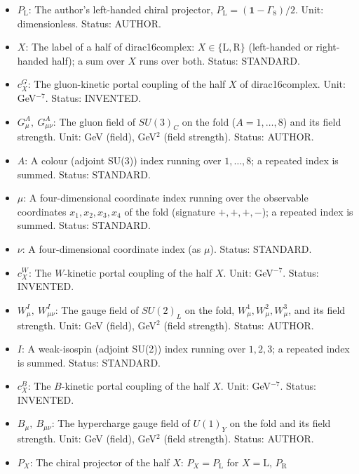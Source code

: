 \documentclass[
  10pt,
]{article}
\begin{document}
\begin{itemize}
  states, its adjoint with respect to the scalar product of that space
  (for the quantised dirac16complex the indefinite Krein scalar
  product). Status: STANDARD.
\item
  \(P_{\mathrm{L}}\): The author's left-handed chiral projector,
  \(P_{\mathrm{L}} = (\mathbf{1} - \Gamma_8)/2\). Unit: dimensionless.
  Status: AUTHOR.
\item
  \(X\): The label of a half of dirac16complex:
  \(X \in \{\mathrm{L}, \mathrm{R}\}\) (left-handed or right-handed
  half); a sum over \(X\) runs over both. Status: STANDARD.
\item
  \(c^{G}_X\): The gluon-kinetic portal coupling of the half \(X\) of
  dirac16complex. Unit: GeV\(^{-7}\). Status: INVENTED.
\item
  \(G^A_\mu,\ G^A_{\mu\nu}\): The gluon field of \(SU(3)_C\) on the fold
  (\(A = 1, \dots, 8\)) and its field strength. Unit: GeV (field),
  GeV\(^2\) (field strength). Status: AUTHOR.
\item
  \(A\): A colour (adjoint SU(3)) index running over \(1, \dots, 8\); a
  repeated index is summed. Status: STANDARD.
\item
  \(\mu\): A four-dimensional coordinate index running over the
  observable coordinates \(x_1, x_2, x_3, x_4\) of the fold (signature
  \(+,+,+,-\)); a repeated index is summed. Status: STANDARD.
\item
  \(\nu\): A four-dimensional coordinate index (as \(\mu\)). Status:
  STANDARD.
\item
  \(c^{W}_X\): The \(W\)-kinetic portal coupling of the half \(X\).
  Unit: GeV\(^{-7}\). Status: INVENTED.
\item
  \(W^I_\mu,\ W^I_{\mu\nu}\): The gauge field of \(SU(2)_L\) on the
  fold, \(W^1_\mu, W^2_\mu, W^3_\mu\), and its field strength. Unit: GeV
  (field), GeV\(^2\) (field strength). Status: AUTHOR.
\item
  \(I\): A weak-isospin (adjoint SU(2)) index running over \(1, 2, 3\);
  a repeated index is summed. Status: STANDARD.
\item
  \(c^{B}_X\): The \(B\)-kinetic portal coupling of the half \(X\).
  Unit: GeV\(^{-7}\). Status: INVENTED.
\item
  \(B_\mu,\ B_{\mu\nu}\): The hypercharge gauge field of \(U(1)_Y\) on
  the fold and its field strength. Unit: GeV (field), GeV\(^2\) (field
  strength). Status: AUTHOR.
\item
  \(P_X\): The chiral projector of the half \(X\):
  \(P_X = P_{\mathrm{L}}\) for \(X = \mathrm{L}\), \(P_{\mathrm{R}}\)

\end{itemize}
\end{document}
